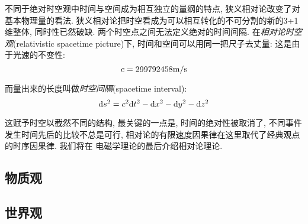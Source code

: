 不同于绝对时空观中时间与空间成为相互独立的量纲的特点, 狭义相对论改变了对基本物理量的看法. 狭义相对论把时空看成为可以相互转化的不可分割的新的3+1维整体, 同时性已然破缺. 两个时空点之间无法定义绝对的时间间隔. 在\emph{相对论时空观}(relativistic spacetime picture)下, 时间和空间可以用同一把尺子去丈量: 这是由于光速的不变性:
\[c=299792458{\rm m/s}\]

而量出来的长度叫做\emph{时空间隔}(spacetime interval):
\[\textrm{d} s^2=c^2\textrm{d} t^2-\textrm{d} x^2-\textrm{d} y^2-\textrm{d} z^2\]

这赋予时空以截然不同的结构, 最关键的一点是, 时间的绝对性被取消了, 不同事件发生时间先后的比较不总是可行, 相对论的有限速度因果律在这里取代了经典观点的时序因果律. 我们将在 电磁学理论的最后介绍相对论理论.

\subsection{物质观}\label{2-1-2}

\subsection{世界观}\label{2-1-3}